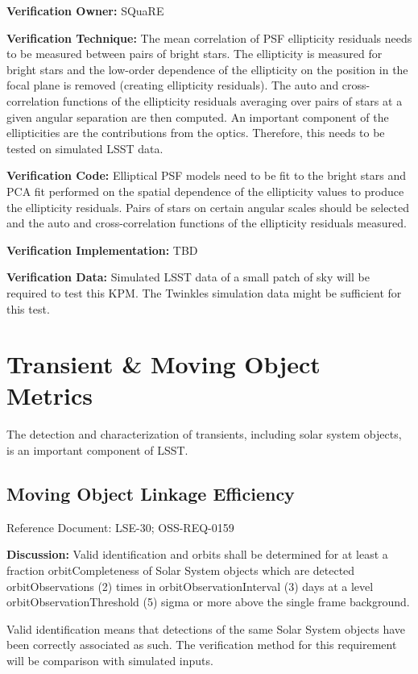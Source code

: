 \documentclass[DM,lsstdraft,toc]{lsstdoc}
\begin{document}
\textbf{Verification Owner:} SQuaRE

\textbf{Verification Technique:} The mean correlation of PSF ellipticity
residuals needs to be measured between pairs of bright stars. The
ellipticity is measured for bright stars and the low-order dependence of
the ellipticity on the position in the focal plane is removed (creating
ellipticity residuals). The auto and cross-correlation functions of the
ellipticity residuals averaging over pairs of stars at a given angular
separation are then computed. An important component of the
ellipticities are the contributions from the optics. Therefore, this
needs to be tested on simulated LSST data.

\textbf{Verification Code:} Elliptical PSF models need to be fit to the
bright stars and PCA fit performed on the spatial dependence of the
ellipticity values to produce the ellipticity residuals. Pairs of stars
on certain angular scales should be selected and the auto and
cross-correlation functions of the ellipticity residuals measured.

\textbf{Verification Implementation:} TBD

\textbf{Verification Data:} Simulated LSST data of a small patch of sky
will be required to test this KPM. The Twinkles simulation data might be
sufficient for this test.

\section{Transient \& Moving Object
Metrics}\label{transient-moving-object-metrics}

The detection and characterization of transients, including solar system
objects, is an important component of LSST.

\subsection{Moving Object Linkage
Efficiency}\label{moving-object-linkage-efficiency}

Reference Document: LSE-30; OSS-REQ-0159

\textbf{Discussion:} Valid identification and orbits shall be determined
for at least a fraction orbitCompleteness of Solar System objects which
are detected orbitObservations (2) times in orbitObservationInterval (3)
days at a level orbitObservationThreshold (5) sigma or more above the
single frame background.

Valid identification means that detections of the same Solar System
objects have been correctly associated as such. The verification method
for this requirement will be comparison with simulated inputs.
\end{document}
